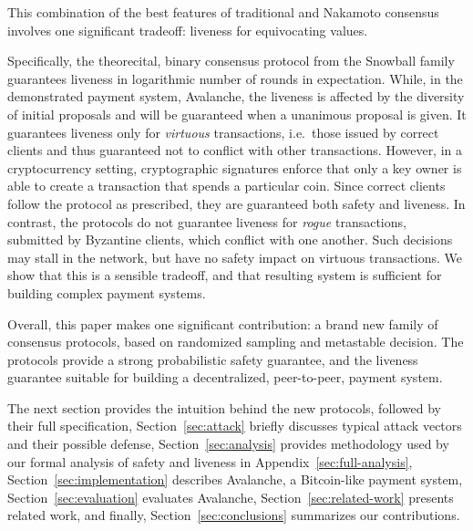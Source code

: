 \documentclass[letterpaper,twocolumn,10pt]{article}
\newcommand{\editchange}[1]{{\color{orange}#1}}
\theoremstyle{definition}
\begin{document}
This combination of the best features of traditional and Nakamoto consensus involves one significant tradeoff: liveness for \editchange{equivocating values}. %

\editchange{Specifically, the theorecital, binary consensus protocol from the Snowball family guarantees liveness in logarithmic number of rounds in expectation. While, in the demonstrated payment system, Avalanche, the liveness is affected by the diversity of initial proposals and will be guaranteed when a unanimous proposal is given.
It guarantees liveness only for \emph{virtuous} transactions, i.e.\ those issued by correct clients and thus guaranteed not to conflict with other transactions.
However,} in a cryptocurrency setting, cryptographic signatures enforce that only a key owner is able to create a transaction that spends a particular coin.
Since correct clients follow the protocol as prescribed, they are guaranteed both safety and liveness.
In contrast, the protocols do not guarantee liveness for \emph{rogue} transactions, submitted by Byzantine clients, which conflict with one another.
Such decisions may stall in the network, but have no safety impact on virtuous transactions.
We show that this is a sensible tradeoff, and that resulting system is sufficient for building complex payment systems.

Overall, this paper makes one significant contribution: a brand new family of consensus protocols, based on randomized sampling and metastable decision. The protocols provide a strong probabilistic safety guarantee, and \editchange{the liveness guarantee suitable for building a decentralized, peer-to-peer, payment system.}

The next section provides the intuition behind the new protocols, followed by their full specification,
Section~\ref{sec:attack} briefly discusses typical attack vectors and their possible defense,
Section~\ref{sec:analysis} provides methodology used
by our formal analysis of safety and liveness in Appendix~\ref{sec:full-analysis},
Section~\ref{sec:implementation} describes \editchange{Avalanche, a Bitcoin-like payment system,
Section~\ref{sec:evaluation} evaluates Avalanche},
Section~\ref{sec:related-work} presents related work, and finally, Section~\ref{sec:conclusions} summarizes our contributions.
\end{document}
